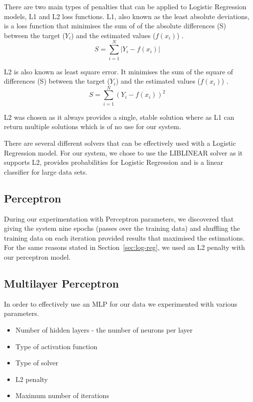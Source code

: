 \documentclass[bsc,frontabs,twoside,singlespacing,parskip,deptreport]{infthesis}     %
\begin{document}
 There are two main types of penalties that can be applied to Logistic Regression models, L1 and L2 loss functions.
 L1, also known as  the least absolute deviations, is a loss function that minimises the sum of of the absolute
 differences (S) between the target ($Y_i$) and the estimated values ($f(x_{i})$) \cite{l1l2}.
 \begin{equation}
   S = \sum_{i=1}^{N} | Y_i - f(x_i)|\nonumber
   \end{equation}
 
 L2 is also known as least square error. It minimises the sum of the square of differences (S) between
 the target ($Y_i$) and the estimated values ($f(x_{i})$) \cite{l1l2}.
 \begin{equation}
   S = \sum_{i=1}^{N} ( Y_i - f(x_i))^2\nonumber
   \end{equation}

 L2 was chosen as it always provides a single, stable solution where as L1 can return multiple solutions
 which is of no use for our system.

 There are several different solvers that can be effectively used with a Logistic Regression model.
 For our system, we chose to use the LIBLINEAR solver as it supports L2, provides probabilities
 for Logistic Regression and is a linear classifier for large data sets\cite{fan2008liblinear}.
 
 \subsection{Perceptron}
 During our experimentation with Perceptron parameters, we discovered that giving the system nine epochs (passes
 over the training data) and shuffling the training data on each iteration provided results that maximised the
 estimations. For the same reasons stated in Section~\ref{sec:log-reg}, we used an L2 penalty with our perceptron
 model.
 
 \subsection{Multilayer Perceptron}
 In order to effectively use an MLP for our data we experimented with various parameters.
 \begin{itemize}
 \item Number of hidden layers - the number of neurons per layer
 \item Type of activation function
 \item Type of solver
 \item L2 penalty
 \item Maximum number of iterations
 \end{itemize}
 
\end{document}
